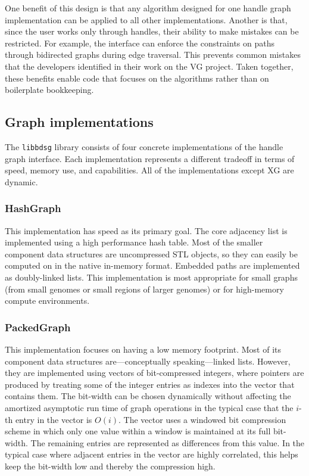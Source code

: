 \documentclass{article}
\begin{document}
One benefit of this design is that any algorithm designed for one handle graph implementation can be applied to all other implementations. Another is that, since the user works only through handles, their ability to make mistakes can be restricted. For example, the interface can enforce the constraints on paths through bidirected graphs during edge traversal. This prevents common mistakes that the developers identified in their work on the VG project. Taken together, these benefits enable code that focuses on the algorithms rather than on boilerplate bookkeeping.

\subsection{Graph implementations}

The \texttt{libbdsg} library consists of four concrete implementations of the handle graph interface. Each implementation represents a different tradeoff in terms of speed, memory use, and capabilities. All of the implementations except XG are dynamic.

\subsubsection{HashGraph}

This implementation has speed as its primary goal. The core adjacency list is implemented using a high performance hash table. Most of the smaller component data structures are uncompressed STL objects, so they can easily be computed on in the native in-memory format. Embedded paths are implemented as doubly-linked lists. This implementation is most appropriate for small graphs (from small genomes or small regions of larger genomes) or for high-memory compute environments.

\subsubsection{PackedGraph}

This implementation focuses on having a low memory footprint. Most of its component data structures are---conceptually speaking---linked lists. However, they are implemented using vectors of bit-compressed integers, where pointers are produced by treating some of the integer entries as indexes into the vector that contains them. The bit-width can be chosen dynamically without affecting the amortized asymptotic run time of graph operations in the typical case that the $i$-th entry in the vector is $O(i)$. The vector uses a windowed bit compression scheme in which only one value within a window is maintained at its full bit-width. The remaining entries are represented as differences from this value. In the typical case where adjacent entries in the vector are highly correlated, this helps keep the bit-width low and thereby the compression high. 
\end{document}

